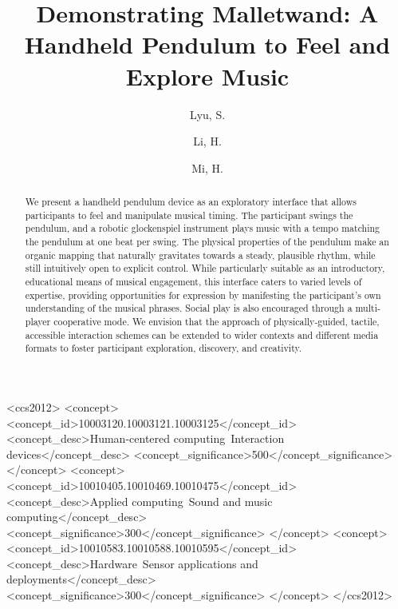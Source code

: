 \documentclass[manuscript,review]{acmart}
\begin{document}
\title{Demonstrating Malletwand: A Handheld Pendulum to Feel and Explore Music}

\author{Lyu, S.}
\author{Li, H.}
\author{Mi, H.}

\renewcommand{\shortauthors}{Lyu et al.}

\begin{abstract}
We present a handheld pendulum device as an exploratory interface that allows participants to feel and manipulate musical timing. The participant swings the pendulum, and a robotic glockenspiel instrument plays music with a tempo matching the pendulum at one beat per swing. The physical properties of the pendulum make an organic mapping that naturally gravitates towards a steady, plausible rhythm, while still intuitively open to explicit control. While particularly suitable as an introductory, educational means of musical engagement, this interface caters to varied levels of expertise, providing opportunities for expression by manifesting the participant's own understanding of the musical phrases. Social play is also encouraged through a multi-player cooperative mode. We envision that the approach of physically-guided, tactile, accessible interaction schemes can be extended to wider contexts and different media formats to foster participant exploration, discovery, and creativity.
\end{abstract}

\begin{CCSXML}
<ccs2012>
<concept>
<concept_id>10003120.10003121.10003125</concept_id>
<concept_desc>Human-centered computing~Interaction devices</concept_desc>
<concept_significance>500</concept_significance>
</concept>
<concept>
<concept_id>10010405.10010469.10010475</concept_id>
<concept_desc>Applied computing~Sound and music computing</concept_desc>
<concept_significance>300</concept_significance>
</concept>
<concept>
<concept_id>10010583.10010588.10010595</concept_id>
<concept_desc>Hardware~Sensor applications and deployments</concept_desc>
<concept_significance>300</concept_significance>
</concept>
</ccs2012>
\end{CCSXML}


\end{document}
